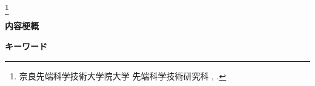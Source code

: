 \begin{center}
        \renewcommand{\thefootnote}{\fnsymbol{footnote}}
        \Large\bfseries \jtitle\footnote[1]
                {奈良先端科学技術大学院大学 先端科学技術研究科 \jdoctitle,
                \jdate.}
        \renewcommand{\thefootnote}{\arabic{footnote}}
\end{center}
\vspace*{1truemm}
\begin{center}
        \large\jauthor
\end{center}
\vspace*{10truemm}
\begin{center}
\textbf{内容梗概}
\end{center}
\vspace*{2truemm}
\par
\jabstract
\vspace*{5truemm}
\begin{flushleft}
        \textbf{キーワード}
\end{flushleft}
\keywords

